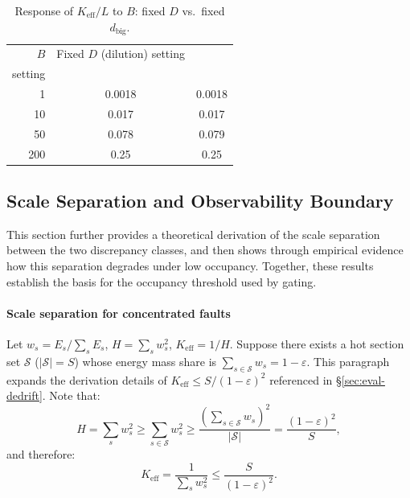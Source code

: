 \begin{table}[!htbp]
\centering
\small
\begin{tabular}{rcc}
\toprule
$B$ & Fixed $D$ (dilution) setting & \shortstack{Fixed $d_{\text{big}}$ ($D=B\times 10^4$) \\ setting} \\
\midrule
1 & 0.0018 & 0.0018 \\
10 & 0.017 & 0.017 \\
50 & 0.078 & 0.079 \\
200 & 0.25 & 0.25 \\
\bottomrule
\end{tabular}
\caption{Response of $K_{\text{eff}}/L$ to $B$: fixed $D$ vs.\ fixed $d_{\text{big}}$.}
\label{tab:c3-3}
\end{table}


\subsection{Scale Separation and Observability Boundary}
\label{sec:appendix-gating-separation}

This section further provides a theoretical derivation of the scale separation between the two discrepancy classes, and then shows through empirical evidence how this separation degrades under low occupancy. Together, these results establish the basis for the occupancy threshold used by gating.

\paragraph{Scale separation for concentrated faults}
Let $w_s=E_s/\sum_s E_s$, $H=\sum_s w_s^2$, $K_{\text{eff}}=1/H$. Suppose there exists a hot section set $\mathcal{S}$ ($|\mathcal{S}|=S$) whose energy mass share is $\sum_{s\in\mathcal{S}}w_s=1-\varepsilon$. This paragraph expands the derivation details of $K_{\text{eff}}\le S/(1{-}\varepsilon)^2$ referenced in \S\ref{sec:eval-dedrift}. Note that:
\[
H=\sum_s w_s^2 \ge \sum_{s\in\mathcal{S}} w_s^2 \ge \frac{\left(\sum_{s\in\mathcal{S}} w_s\right)^2}{|\mathcal{S}|}=\frac{(1-\varepsilon)^2}{S},
\]
and therefore:
\[
K_{\text{eff}}=\frac{1}{\sum_s w_s^2}\le \frac{S}{(1-\varepsilon)^2}.
\]

